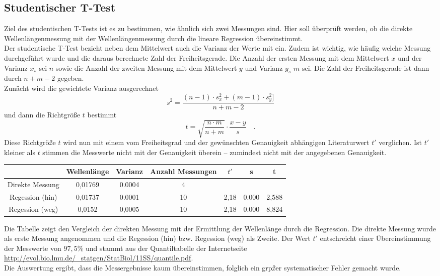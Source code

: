 \subsection{Studentischer T-Test}
Ziel des studentischen T-Tests ist es zu bestimmen, wie ähnlich sich zwei Messungen sind. Hier soll überprüft werden, ob die direkte Wellenlängenmessung mit der Wellenlängenmessung durch die lineare Regression übereinstimmt. \\
Der studentische T-Test bezieht neben dem Mittelwert auch die Varianz der Werte mit ein. Zudem ist wichtig, wie häufig welche Messung durchgeführt wurde und die daraus berechnete Zahl der Freiheitsgerade.
Die Anzahl der ersten Messung mit dem Mittelwert $x$ und der Varianz $x_s$ sei $n$ sowie die Anzahl der zweiten Messung mit dem Mittelwert $y$ und Varianz  $y_s$  $m$ sei. Die Zahl der Freiheitsgerade ist dann durch $n + m - 2$ gegeben. \\
Zunächt wird die gewichtete Varianz ausgerechnet
\begin{equation}
s^2 = \frac{(n-1) \cdot  s_x^2 +(m-1) \cdot s_y^2]}{n +m -2}
\end{equation}
und dann die Richtgröße $t$ bestimmt
\begin{equation}
t = \sqrt{\frac{n \cdot m}{n+m}} \cdot \frac{x-y}{s}  \quad .
\end{equation}
Diese Richtgröße $t$ wird nun mit einem vom Freiheitsgrad und der gewünschten Genauigkeit abhängigen Literaturwert $t'$ verglichen.
Ist $t'$ kleiner als $t$ stimmen die Messwerte nicht mit der Genauigkeit überein -- zumindest nicht mit der angegebenen Genauigkeit. \\
\begin{tabular}{c | c c c c c c}
	& Wellenlänge & Varianz & Anzahl Messungen & $t'$ & s & t \\
	\hline
	Direkte Messung &  0,01769 & 0.0004 & 4 &  &  &  \\
	Regession (hin) & 0,01737 & 0.0001 & 10 & 2,18 & 0.000 & 2,588 \\
	Regession (weg) & 0,0152 & 0,0005 & 10 & 2,18 & 0.000 & 8,824 \\
	\end{tabular}
Die Tabelle zeigt den Vergleich der direkten Messung mit der Ermittlung der Wellenlänge durch die Regression. Die direkte Messung wurde als erste Messung angenommen und die Regession (hin) bzw. Regession (weg)  als Zweite. Der Wert $t'$ entschreicht einer Übereinstimmung der Messwerte von $97,5 \%$ und stammt aus der Quantiltabelle der Internetseite \url{http://evol.bio.lmu.de/_statgen/StatBiol/11SS/quantile.pdf}. \\
Die Auswertung ergibt, dass die Messergebnisse kaum übereinstimmen, folglich ein grpßer systematischer Fehler gemacht wurde.


